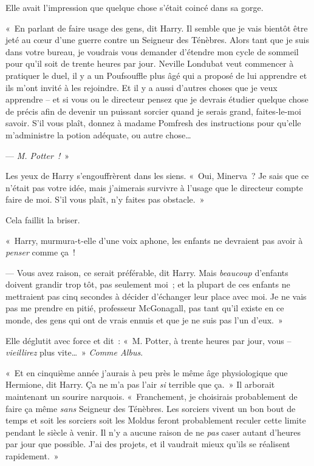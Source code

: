 Elle avait l'impression que quelque chose s'était coincé dans sa gorge.

«~En parlant de faire usage des gens, dit Harry. Il semble que je vais bientôt être jeté au cœur d'une guerre contre un Seigneur des Ténèbres. Alors tant que je suis dans votre bureau, je voudrais vous demander d'étendre mon cycle de sommeil pour qu'il soit de trente heures par jour. Neville Londubat veut commencer à pratiquer le duel, il y a un Poufsouffle plus âgé qui a proposé de lui apprendre et ils m'ont invité à les rejoindre. Et il y a aussi d'autres choses que je veux apprendre -- et si vous ou le directeur pensez que je devrais étudier quelque chose de précis afin de devenir un puissant sorcier quand je serais grand, faites-le-moi savoir. S'il vous plaît, donnez à madame Pomfresh des instructions pour qu'elle m'administre la potion adéquate, ou autre chose…

--- \emph{M. Potter~!}~»

Les yeux de Harry s'engouffrèrent dans les siens. «~Oui, Minerva~? Je sais que ce n'était pas votre idée, mais j'aimerais survivre à l'usage que le directeur compte faire de moi. S'il vous plaît, n'y faites pas obstacle.~»

Cela faillit la briser.

«~Harry, murmura-t-elle d'une voix aphone, les enfants ne devraient pas avoir à \emph{penser} comme ça~!

--- Vous avez raison, ce serait préférable, dit Harry. Mais \emph{beaucoup} d'enfants doivent grandir trop tôt, pas seulement moi~; et la plupart de ces enfants ne mettraient pas cinq secondes à décider d'échanger leur place avec moi. Je ne vais pas me prendre en pitié, professeur McGonagall, pas tant qu'il existe en ce monde, des gens qui ont de vrais ennuis et que je ne suis pas l'un d'eux.~»

Elle déglutit avec force et dit~: «~M. Potter, à trente heures par jour, vous -- \emph{vieillirez} plus vite…~» \emph{Comme Albus}.

«~Et en cinquième année j'aurais à peu près le même âge physiologique que Hermione, dit Harry. Ça ne m'a pas l'air \emph{si} terrible que ça.~» Il arborait maintenant un sourire narquois. «~Franchement, je choisirais probablement de faire ça même \emph{sans} Seigneur des Ténèbres. Les sorciers vivent un bon bout de temps et soit les sorciers soit les Moldus feront probablement reculer cette limite pendant le siècle à venir. Il n'y a aucune raison de ne \emph{pas} caser autant d'heures par jour que possible. J'ai des projets, et il vaudrait mieux qu'ils se réalisent rapidement.~»

